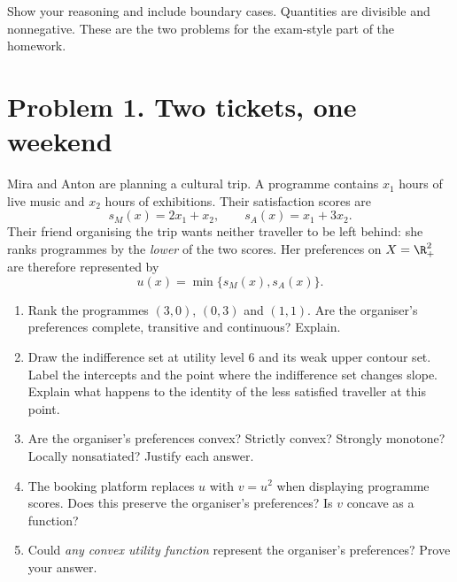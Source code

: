Show your reasoning and include boundary cases. Quantities are divisible and nonnegative. These are the two problems for the exam-style part of the homework.
\section*{Problem 1. Two tickets, one weekend}
Mira and Anton are planning a cultural trip. A programme contains $x_1$ hours of live music and $x_2$ hours of exhibitions. Their satisfaction scores are
\[
 s_M(x)=2x_1+x_2,\qquad s_A(x)=x_1+3x_2.
\]
Their friend organising the trip wants neither traveller to be left behind: she ranks programmes by the \emph{lower} of the two scores. Her preferences on $X=\R_+^2$ are therefore represented by
\[
 u(x)=\min\{s_M(x),s_A(x)\}.
\]
\begin{enumerate}[label=(\alph*)]
\item Rank the programmes $(3,0)$, $(0,3)$ and $(1,1)$. Are the organiser's preferences complete, transitive and continuous? Explain.
\item Draw the indifference set at utility level 6 and its weak upper contour set. Label the intercepts and the point where the indifference set changes slope. Explain what happens to the identity of the less satisfied traveller at this point.
\item Are the organiser's preferences convex? Strictly convex? Strongly monotone? Locally nonsatiated? Justify each answer.
\item The booking platform replaces $u$ with $v=u^2$ when displaying programme scores. Does this preserve the organiser's preferences? Is $v$ concave as a function?
\item Could \emph{any convex utility function} represent the organiser's preferences? Prove your answer.
\end{enumerate}
\clearpage
